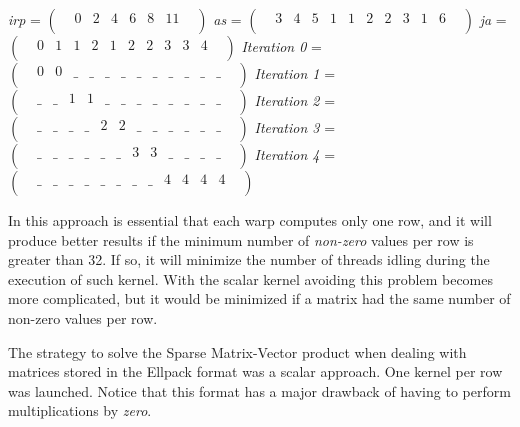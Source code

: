 \documentclass[12pt]{article}
\begin{document}
\begin{center}
\textit{irp}  =   
$
\begin{pmatrix}
    & 0 & 2 & 4 & 6 & 8 & 11 & \\
\end{pmatrix}
$
\linebreak
\textit{as}  =   
$
\begin{pmatrix}
    & 3 & 4 & 5 & 1 & 1 & 2 & 2 & 3 & 1 & 6 & \\
\end{pmatrix}
$
\linebreak
\textit{ja}  =   
$
\begin{pmatrix}
    & 0 & 1 & 1 & 2 & 1 & 2 & 2 & 3 & 3 & 4 & \\
\end{pmatrix}
$
\linebreak
\linebreak
\textit{Iteration 0}  =   
$
\begin{pmatrix}
    & 0 & 0 & \_ & \_ & \_ & \_ & \_ & \_ & \_ & \_ & \_ & \_ &  \\
\end{pmatrix}
$
\linebreak
\textit{Iteration 1}  =   
$
\begin{pmatrix}
    & \_ & \_ & 1 & 1 & \_ & \_ & \_ & \_ & \_ & \_ & \_ & \_ &  \\
\end{pmatrix}
$
\linebreak
\textit{Iteration 2}  =   
$
\begin{pmatrix}
    & \_ & \_ & \_ & \_ & 2 & 2 & \_ & \_ & \_ & \_ & \_ & \_ &  \\
\end{pmatrix}
$
\linebreak
\textit{Iteration 3}  =   
$
\begin{pmatrix}
    & \_ & \_ & \_ & \_ & \_ & \_ & 3 & 3 & \_ & \_ & \_ & \_ & \\
\end{pmatrix}
$
\linebreak
\textit{Iteration 4}  =   
$
\begin{pmatrix}
    & \_ & \_ & \_ & \_ & \_ & \_ & \_ & \_ & 4 & 4 & 4 & 4 & \\
\end{pmatrix}
$
\linebreak
\end{center}

\par In this approach is essential that each warp computes only one row, and it will produce better results if the minimum number of \textit{non-zero} values per row is greater than 32. If so, it will minimize the number of threads idling during the execution of such kernel. With the scalar kernel avoiding this problem becomes more complicated, but it would be minimized if a matrix had the same number of non-zero values per row.
\par The strategy to solve the Sparse Matrix-Vector product when dealing with matrices stored in the Ellpack format was a scalar approach. One kernel per row was launched. Notice that this format has a major drawback of having to perform multiplications by \textit{zero}. 
\end{document}

